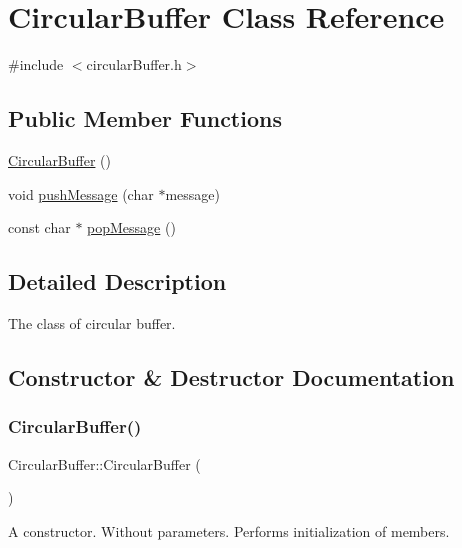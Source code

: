 \hypertarget{classCircularBuffer}{}\section{Circular\+Buffer Class Reference}
\label{classCircularBuffer}


{\ttfamily \#include $<$circular\+Buffer.\+h$>$}

\subsection*{Public Member Functions}
\begin{DoxyCompactItemize}
\item 
\mbox{\hyperlink{classCircularBuffer_a8c5de0e610bb50bac684f4707e23431c}{Circular\+Buffer}} ()
\item 
void \mbox{\hyperlink{classCircularBuffer_a581f918b98d088089f4db7c26c89860a}{push\+Message}} (char $\ast$message)
\item 
const char $\ast$ \mbox{\hyperlink{classCircularBuffer_a1f3e0cad472e639cae523adc485b9454}{pop\+Message}} ()
\end{DoxyCompactItemize}


\subsection{Detailed Description}
The class of circular buffer. 

\subsection{Constructor \& Destructor Documentation}
\mbox{\label{classCircularBuffer_a8c5de0e610bb50bac684f4707e23431c}} 
\subsubsection{\texorpdfstring{Circular\+Buffer()}{CircularBuffer()}}
{\footnotesize\ttfamily Circular\+Buffer\+::\+Circular\+Buffer (\begin{DoxyParamCaption}{ }\end{DoxyParamCaption})}

A constructor. Without parameters. Performs initialization of members. 

